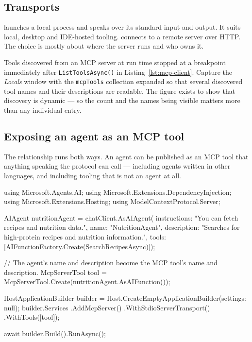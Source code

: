 \subsection{Transports}

 launches a local process and speaks over its standard
input and output. It suits local, desktop and IDE-hosted tooling.
 connects to a remote server over HTTP. The choice is
mostly about where the server runs and who owns it.

%
{Tools discovered from an MCP server at run time}%
{\vsver{} stopped at a breakpoint immediately after \texttt{ListToolsAsync()} in
Listing~\ref{lst:mcp-client}. Capture the \emph{Locals} window with the
\texttt{mcpTools} collection expanded so that several discovered tool names and
their descriptions are readable. The figure exists to show that discovery is
dynamic --- so the count and the names being visible matters more than any
individual entry.}

\subsection{Exposing an agent as an MCP tool}
\label{sec:mcp-server}

The relationship runs both ways. An agent can be published as an MCP tool that
anything speaking the protocol can call --- including agents written in other
languages, and including tooling that is not an agent at all.

\begin{csharp}[caption={Publishing an agent over MCP}, label={lst:mcp-server}]
using Microsoft.Agents.AI;
using Microsoft.Extensions.DependencyInjection;
using Microsoft.Extensions.Hosting;
using ModelContextProtocol.Server;

AIAgent nutritionAgent = chatClient.AsAIAgent(
    instructions: "You can fetch recipes and nutrition data.",
    name: "NutritionAgent",
    description: "Searches for high-protein recipes and nutrition information.",
    tools: [AIFunctionFactory.Create(SearchRecipesAsync)]);

// The agent's name and description become the MCP tool's name and description.
McpServerTool tool = McpServerTool.Create(nutritionAgent.AsAIFunction());

HostApplicationBuilder builder = Host.CreateEmptyApplicationBuilder(settings: null);
builder.Services
    .AddMcpServer()
    .WithStdioServerTransport()
    .WithTools([tool]);

await builder.Build().RunAsync();
\end{csharp}

